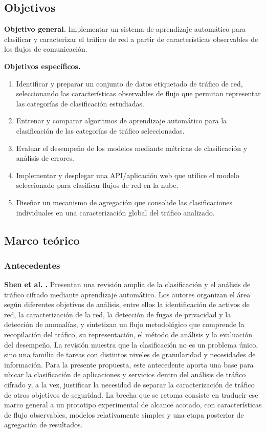 \documentclass[conference]{IEEEtran}
\begin{document}
\subsection{Objetivos}

\textbf{Objetivo general.} Implementar un sistema de aprendizaje automático para clasificar y caracterizar el tráfico de red a partir de características observables de los flujos de comunicación.

\textbf{Objetivos específicos.}
\begin{enumerate}
\item Identificar y preparar un conjunto de datos etiquetado de tráfico de red, seleccionando las características observables de flujo que permitan representar las categorías de clasificación estudiadas.
\item Entrenar y comparar algoritmos de aprendizaje automático para la clasificación de las categorías de tráfico seleccionadas.
\item Evaluar el desempeño de los modelos mediante métricas de clasificación y análisis de errores.
\item Implementar y desplegar una API/aplicación web que utilice el modelo seleccionado para clasificar flujos de red en la nube.
\item Diseñar un mecanismo de agregación que consolide las clasificaciones individuales en una caracterización global del tráfico analizado.
\end{enumerate}

\subsection{Marco teórico}

\subsubsection{Antecedentes}

\textbf{Shen et al. \cite{shen2023}.} Presentan una revisión amplia de la clasificación y el análisis de tráfico cifrado mediante aprendizaje automático. Los autores organizan el área según diferentes objetivos de análisis, entre ellos la identificación de activos de red, la caracterización de la red, la detección de fugas de privacidad y la detección de anomalías, y sintetizan un flujo metodológico que comprende la recopilación del tráfico, su representación, el método de análisis y la evaluación del desempeño. La revisión muestra que la clasificación no es un problema único, sino una familia de tareas con distintos niveles de granularidad y necesidades de información. Para la presente propuesta, este antecedente aporta una base para ubicar la clasificación de aplicaciones y servicios dentro del análisis de tráfico cifrado y, a la vez, justificar la necesidad de separar la caracterización de tráfico de otros objetivos de seguridad. La brecha que se retoma consiste en traducir ese marco general a un prototipo experimental de alcance acotado, con características de flujo observables, modelos relativamente simples y una etapa posterior de agregación de resultados.
\end{document}
